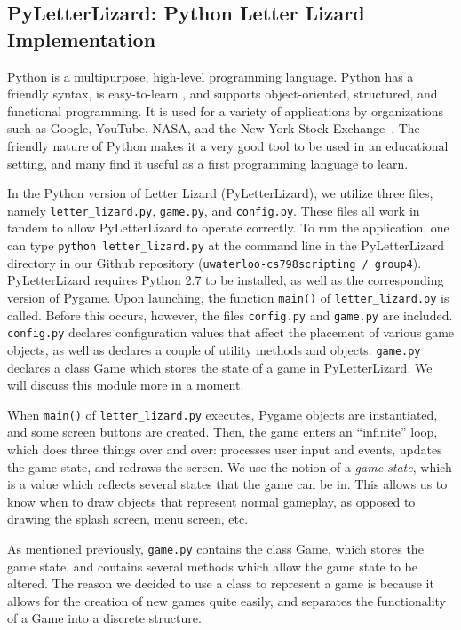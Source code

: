 
\subsection{PyLetterLizard: Python Letter Lizard Implementation}

Python is a multipurpose, high-level programming language. Python has a friendly syntax, is easy-to-learn \cite{about_python}, and supports object-oriented, structured, and functional programming. It is used for a variety of applications by organizations such as Google, YouTube, NASA, and the New York Stock Exchange~\cite{whatis_python}. The friendly nature of Python makes it a very good tool to be used in an educational setting, and many find it useful as a first programming language to learn.
		
	In the Python version of Letter Lizard (PyLetterLizard), we utilize three files, namely \texttt{letter\_lizard.py}, \texttt{game.py}, and \texttt{config.py}. These files all work in tandem to allow PyLetterLizard to operate correctly. To run the application, one can type \texttt{python letter\_lizard.py} at the command line in the PyLetterLizard directory in our Github repository (\texttt{uwaterloo-cs798scripting / group4}). PyLetterLizard requires Python 2.7 to be installed, as well as the corresponding version of Pygame.  Upon launching, the function \texttt{main()} of \texttt{letter\_lizard.py} is called. Before this occurs, however, the files \texttt{config.py} and \texttt{game.py} are included. \texttt{config.py} declares configuration values that affect the placement of various game objects, as well as declares a couple of utility methods and objects. \texttt{game.py} declares a class Game which stores the state of a game in PyLetterLizard. We will discuss this module more in a moment.
	
	When \texttt{main()} of \texttt{letter\_lizard.py} executes, Pygame objects are instantiated, and some screen buttons are created. Then, the game enters an ``infinite'' loop, which does three things over and over: processes user input and events, updates the game state, and redraws the screen. We use the notion of a \emph{game state}, which is a value which reflects several states that the game can be in. This allows us to know when to draw objects that represent normal gameplay, as opposed to drawing the splash screen, menu screen, etc.
	
	As mentioned previously, \texttt{game.py} contains the class Game, which stores the game state, and contains several methods which allow the game state to be altered. The reason we decided to use a class to represent a game is because it allows for the creation of new games quite easily, and separates the functionality of a Game into a discrete structure.
	
